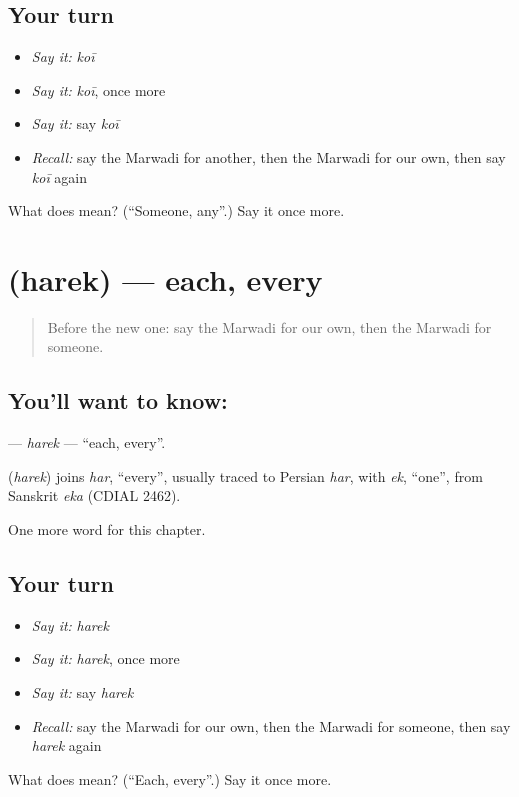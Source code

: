 \subsection*{Your turn}
\begin{itemize}
\raggedright
  \item \emph{Say it:} \emph{koī}
  \item \emph{Say it:} \emph{koī}, once more
  \item \emph{Say it:} say \emph{koī}
  \item \emph{Recall:} say the Marwadi for another, then the Marwadi for our own, then say \emph{koī} again
\end{itemize}

\begin{tcolorbox}[breakable,colback=teal!4,colframe=teal!35!black,title={Before you move on}]
What does  mean? (\textquotedblleft{}Someone, any\textquotedblright{}.) Say it once more.
\end{tcolorbox}
\section[\texorpdfstring{\mw{हरेक} (harek)}{हरेक (harek)}]{ (harek) — each, every}

\label{lesson:MW-C102-harek}



\begin{quote}
Before the new one: say the Marwadi for our own, then the Marwadi for someone.
\end{quote}

\subsection*{You'll want to know: }
\textbf{} — \emph{harek} — \textquotedblleft{}each, every\textquotedblright{}.

\begin{cousinweb}
\textbf{} (\emph{harek}) joins \emph{har}, \textquotedblleft{}every\textquotedblright{}, usually traced to Persian \emph{har}, with \emph{ek}, \textquotedblleft{}one\textquotedblright{}, from Sanskrit \emph{eka} (CDIAL 2462).
\end{cousinweb}

\begin{grammarlens}[title={What you've built}]
One more word for this chapter.
\end{grammarlens}

\subsection*{Your turn}
\begin{itemize}
\raggedright
  \item \emph{Say it:} \emph{harek}
  \item \emph{Say it:} \emph{harek}, once more
  \item \emph{Say it:} say \emph{harek}
  \item \emph{Recall:} say the Marwadi for our own, then the Marwadi for someone, then say \emph{harek} again
\end{itemize}

\begin{tcolorbox}[breakable,colback=teal!4,colframe=teal!35!black,title={Before you move on}]
What does  mean? (\textquotedblleft{}Each, every\textquotedblright{}.) Say it once more.
\end{tcolorbox}
